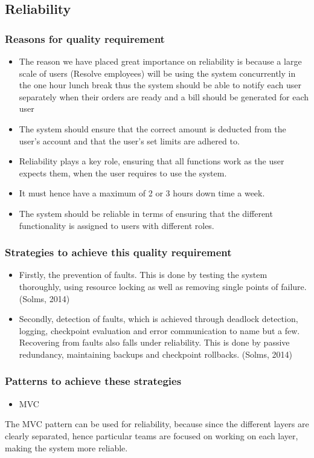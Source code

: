 \documentclass[a4paper,12pt]{article}
\begin{document}
\subsection{Reliability}
\subsubsection{Reasons for quality requirement}
	\begin{itemize}
	\item The reason we have placed great importance on reliability is because a large scale of users (Resolve employees) will be using the system concurrently in the one hour lunch break thus the system should be able to notify each user separately when their orders are ready and a bill should be generated for each user
	\item The system should ensure that the correct amount is deducted from the user's account and that the user's set limits are adhered to.
	\item Reliability plays a key role, ensuring that all functions work as the user expects them, when the user requires to use the system.
	\item It must hence have a maximum of 2 or 3 hours down time a week.
	\item The system should be reliable in terms of ensuring that the different functionality is assigned to users with different roles.  
	\end{itemize}
	\subsubsection{Strategies to achieve this quality requirement}
	\begin{itemize}
	\item Firstly, the prevention of faults. This is done by testing the system thoroughly, using resource locking as well as removing single points of failure. (Solms, 2014)
 \item Secondly, detection of faults, which is achieved through deadlock detection, logging, checkpoint evaluation and error communication to name but a few. Recovering from faults also falls under reliability. This is done by passive redundancy, maintaining backups and checkpoint rollbacks. (Solms, 2014)
 \end{itemize}
 \subsubsection{Patterns to achieve these strategies}
 \begin{itemize}
 \item MVC
 \end{itemize}
 The MVC pattern can  be used for reliability, because since the different layers are clearly separated, hence particular teams are focused on working on each layer, making the system more reliable. 
\end{document}
